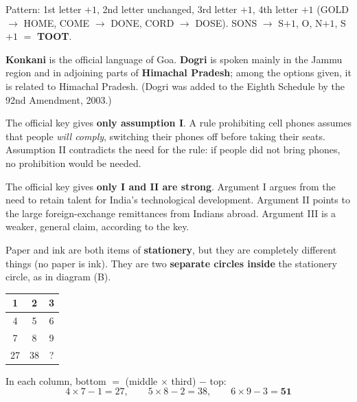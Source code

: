 Pattern: 1st letter $+1$, 2nd letter unchanged, 3rd letter $+1$, 4th letter $+1$ (GOLD $\rightarrow$ HOME, COME $\rightarrow$ DONE, CORD $\rightarrow$ DOSE).
SONS $\rightarrow$ S$+1$, O, N$+1$, S$+1$ $=$ \textbf{TOOT}.

\textbf{Konkani} is the official language of Goa. \textbf{Dogri} is spoken mainly in the Jammu region and in adjoining parts of \textbf{Himachal Pradesh}; among the options given, it is related to Himachal Pradesh. (Dogri was added to the Eighth Schedule by the 92nd Amendment, 2003.)

The official key gives \textbf{only assumption I}. A rule prohibiting cell phones assumes that people \emph{will comply}, switching their phones off before taking their seats. Assumption II contradicts the need for the rule: if people did not bring phones, no prohibition would be needed.

The official key gives \textbf{only I and II are strong}. Argument I argues from the need to retain talent for India's technological development. Argument II points to the large foreign-exchange remittances from Indians abroad. Argument III is a weaker, general claim, according to the key.


Paper and ink are both items of \textbf{stationery}, but they are completely different things (no paper is ink). They are two \textbf{separate circles inside} the stationery circle, as in diagram (B).

\begin{tabular}{|c|c|c|}\hline 1 & 2 & 3\\\hline 4 & 5 & 6\\\hline 7 & 8 & 9\\\hline 27 & 38 & ?\\\hline\end{tabular}

In each column, bottom $=$ (middle $\times$ third) $-$ top:
\[4\times7-1=27,\qquad 5\times8-2=38,\qquad 6\times9-3=\mathbf{51}\]


